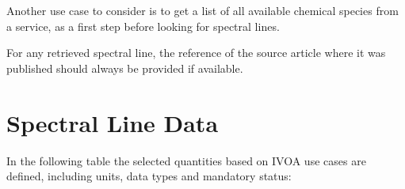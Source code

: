 \documentclass[11pt,a4paper]{ivoa}
\begin{document}
Another use case to consider is to get a list of all available chemical species 
from a service, as a first step before looking for spectral lines.

For any retrieved spectral line, the reference of the source article where it was published
should always be provided if available.



\section{Spectral Line Data}\label{quantities}

In the following table the selected quantities based on IVOA use cases are defined, 
including units, data types and mandatory status:

\end{document}
